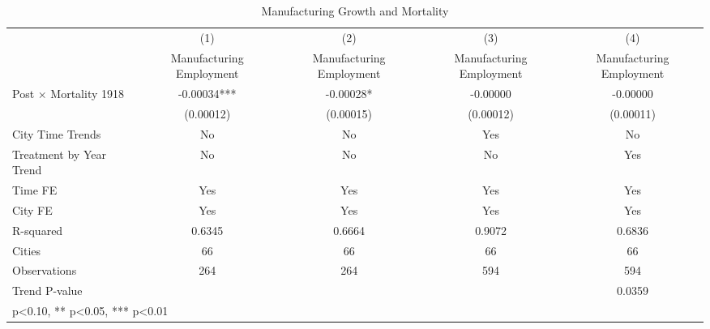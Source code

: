 \begin{table}[htbp]\centering
\def\sym#1{\ifmmode^{#1}\else\(^{#1}\)\fi}
\caption{Manufacturing Growth and Mortality}
\begin{tabular}{l*{4}{c}}
\hline\hline
                    &\multicolumn{1}{c}{(1)}   &\multicolumn{1}{c}{(2)}   &\multicolumn{1}{c}{(3)}   &\multicolumn{1}{c}{(4)}   \\
                    &Manufacturing Employment   &Manufacturing Employment   &Manufacturing Employment   &Manufacturing Employment   \\
\hline
Post $\times$ Mortality 1918&    -0.00034***&    -0.00028*  &    -0.00000   &    -0.00000   \\
                    &   (0.00012)   &   (0.00015)   &   (0.00012)   &   (0.00011)   \\
City Time Trends    &          No   &          No   &         Yes   &          No   \\
Treatment by Year Trend &          No   &          No   &          No   &         Yes   \\
Time FE             &         Yes   &         Yes   &         Yes   &         Yes   \\
\hline
City FE             &         Yes   &         Yes   &         Yes   &         Yes   \\
R-squared           &      0.6345   &      0.6664   &      0.9072   &      0.6836   \\
Cities              &          66   &          66   &          66   &          66   \\
Observations        &         264   &         264   &         594   &         594   \\
Trend P-value       &               &               &               &      0.0359   \\
\hline\hline
\multicolumn{5}{l}{\footnotesize * p<0.10, ** p<0.05, *** p<0.01}\\
\end{tabular}
\end{table}
